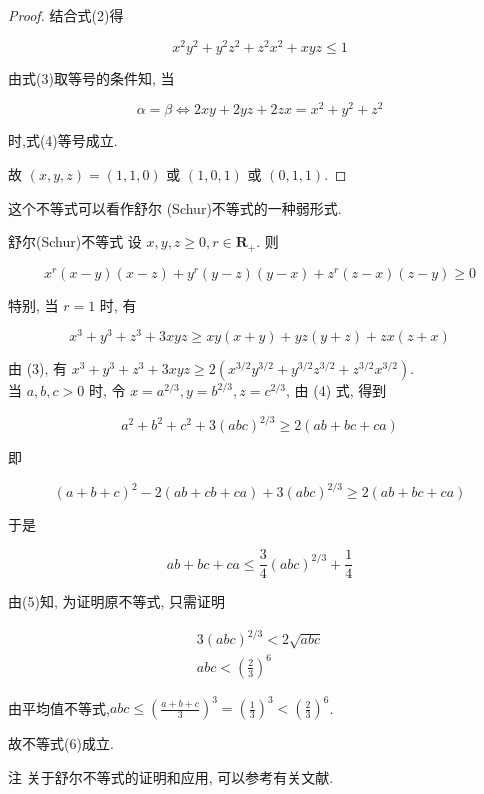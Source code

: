 \begin{proof}
	
	结合式(2)得
	
	
	\begin{equation*}
	x^{2} y^{2}+y^{2} z^{2}+z^{2} x^{2}+x y z \leqslant 1 \tag{4}
	\end{equation*}
	
	
	由式(3)取等号的条件知, 当
	
	$$
	\alpha=\beta \Leftrightarrow 2 x y+2 y z+2 z x=x^{2}+y^{2}+z^{2}
	$$
	
	时,式(4)等号成立.
	
	故 $(x, y, z)=(1,1,0)$ 或 $(1,0,1)$ 或 $(0,1,1)$.
\end{proof}
\begin{note}
	这个不等式可以看作舒尔 (Schur)不等式的一种弱形式.
	
	舒尔(Schur)不等式 设 $x, y, z \geqslant 0, r \in \mathbf{R}_{+}$. 则
	
	$$
	x^{r}(x-y)(x-z)+y^{r}(y-z)(y-x)+z^{r}(z-x)(z-y) \geqslant 0
	$$
	
	特别, 当 $r=1$ 时, 有
	
	
	\begin{equation*}
	x^{3}+y^{3}+z^{3}+3 x y z \geqslant x y(x+y)+y z(y+z)+z x(z+x) \tag{3}
	\end{equation*}
	
	
	由 (3), 有 $x^{3}+y^{3}+z^{3}+3 x y z \geqslant 2\left(x^{3 / 2} y^{3 / 2}+y^{3 / 2} z^{3 / 2}+z^{3 / 2} x^{3 / 2}\right)$.\\
	当 $a, b, c>0$ 时, 令 $x=a^{2 / 3}, y=b^{2 / 3}, z=c^{2 / 3}$, 由 (4) 式, 得到
	
	$$
	a^{2}+b^{2}+c^{2}+3(a b c)^{2 / 3} \geqslant 2(a b+b c+c a)
	$$
	
	即
	
	$$
	(a+b+c)^{2}-2(a b+c b+c a)+3(a b c)^{2 / 3} \geqslant 2(a b+b c+c a)
	$$
	
	于是
	
	
	\begin{equation*}
	a b+b c+c a \leqslant \frac{3}{4}(a b c)^{2 / 3}+\frac{1}{4} \tag{5}
	\end{equation*}
	
	
	由(5)知, 为证明原不等式, 只需证明
	
	
	\begin{gather*}
	3(a b c)^{2 / 3}<2 \sqrt{a b c} \\
	a b c<\left(\frac{2}{3}\right)^{6} \tag{6}
	\end{gather*}
	
	
	由平均值不等式,$a b c \leqslant\left(\frac{a+b+c}{3}\right)^{3}=\left(\frac{1}{3}\right)^{3}<\left(\frac{2}{3}\right)^{6}$.
	
	故不等式(6)成立.
	
	注 关于舒尔不等式的证明和应用, 可以参考有关文献.
\end{note}

